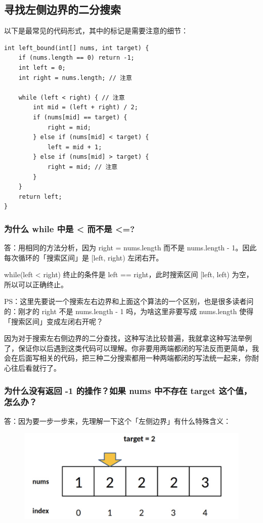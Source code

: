 \documentclass[12pt]{article}
\begin{document}
\subsection{寻找左侧边界的二分搜索}
以下是最常见的代码形式，其中的标记是需要注意的细节：
\begin{lstlisting}
int left_bound(int[] nums, int target) {
    if (nums.length == 0) return -1;
    int left = 0;
    int right = nums.length; // 注意
    
    while (left < right) { // 注意
        int mid = (left + right) / 2;
        if (nums[mid] == target) {
            right = mid;
        } else if (nums[mid] < target) {
            left = mid + 1;
        } else if (nums[mid] > target) {
            right = mid; // 注意
        }
    }
    return left;
}
\end{lstlisting}

\subsubsection{为什么 while 中是 < 而不是 <=?}
答：用相同的方法分析，因为 right = nums.length 而不是 nums.length - 1。因此每次循环的「搜索区间」是 [left, right) 左闭右开。

while(left < right) 终止的条件是 left == right，此时搜索区间 [left, left) 为空，所以可以正确终止。

PS：这里先要说一个搜索左右边界和上面这个算法的一个区别，也是很多读者问的：刚才的 right 不是 nums.length - 1 吗，为啥这里非要写成 nums.length 使得「搜索区间」变成左闭右开呢？

因为对于搜索左右侧边界的二分查找，这种写法比较普遍，我就拿这种写法举例了，保证你以后遇到这类代码可以理解。你非要用两端都闭的写法反而更简单，我会在后面写相关的代码，把三种二分搜索都用一种两端都闭的写法统一起来，你耐心往后看就行了。

\subsubsection{为什么没有返回 -1 的操作？如果 nums 中不存在 target 这个值，怎么办？}

答：因为要一步一步来，先理解一下这个「左侧边界」有什么特殊含义：
\begin{figure}[H]
    \centering
    \includegraphics[width=1\textwidth]{fig/Binary_Search_1.png}
\end{figure}
\end{document}

